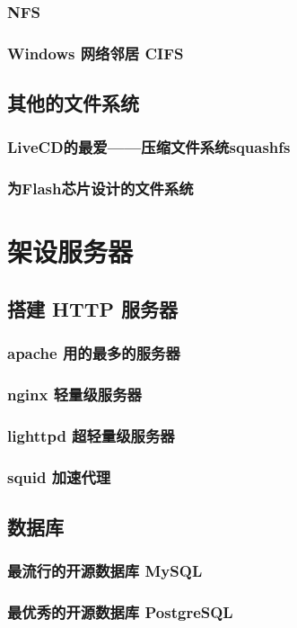 \documentclass[amstex,twoside]{ctexbook}
\begin{document}
\subsection{  NFS	}
\subsection{  Windows 网络邻居 CIFS	}
\section{  其他的文件系统	}
\subsection{  LiveCD的最爱——压缩文件系统squashfs}
\subsection{  为Flash芯片设计的文件系统}

\chapter{架设服务器}
\section{  搭建 HTTP 服务器}
\subsection{  apache 用的最多的服务器}
\subsection{ nginx 轻量级服务器}
\subsection{ lighttpd 超轻量级服务器}
\subsection{ squid 加速代理	}
\section{  数据库	}
\subsection{  最流行的开源数据库 MySQL}
\subsection{  最优秀的开源数据库 PostgreSQL 	}
\end{document}
